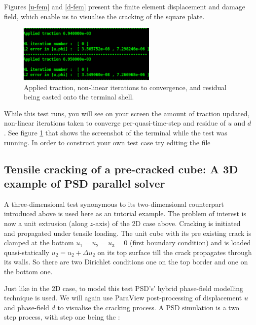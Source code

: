 Figures \ref{u-fem} and \ref{d-fem} present the finite element displacement and damage field, which enable us to visualise the cracking of the square plate.



\begin{figure}[h!]
	\centering
	
	\includegraphics[width=0.6\textwidth]{./Images/terminal1.png}
	\caption{Applied traction, non-linear iterations to convergence, and residual being casted onto the terminal shell. \label{term}}
\end{figure}

While this test runs, you will see on your screen the amount of traction updated, non-linear iterations taken to converge per-quasi-time-step and residue of $u$ and $d$. See figure \ref{term} that shows the screenshot of the terminal while the test was running.  In order to construct your own test case try editing the   file   







\subsection{Tensile cracking of a pre-cracked cube: A 3D example of PSD parallel solver}

A three-dimensional test synonymous to its two-dimensional counterpart introduced above is used here as an tutorial example.   The problem of interest is now a unit extrusion (along $z$-axis) of the 2D case above. Cracking is initiated and propagated under tensile loading. The unit cube with its  pre existing crack  is clamped at the bottom $u_1=u_2=u_3=0$ (first boundary condition) and is loaded quasi-statically $u_2=u_2 + \Delta u_2$ on its top surface till the crack propagates through its walls. So there are two Dirichlet conditions one on the top border and one on the bottom one.

Just like in the 2D case, to model this test PSD's' hybrid phase-field modelling  technique is used. We will again use ParaView post-processing of displacement $u$ and phase-field $d$ to visualise the cracking process. A PSD simulation is a two step process, with step one being the  :

